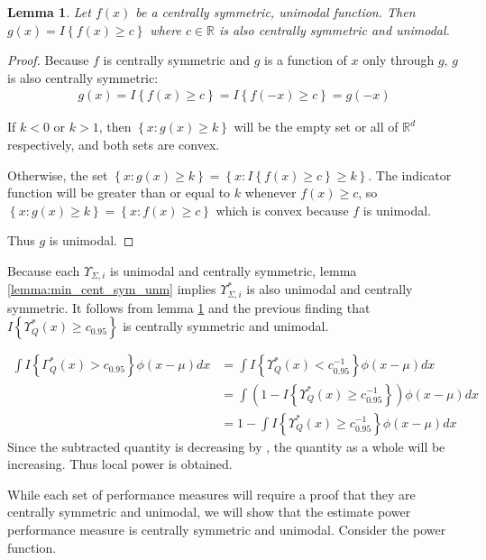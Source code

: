 \documentclass{article}
\newtheorem{lemma}[theorem]{Lemma}
\newcommand{\gi}{\Upsilon}
\begin{document}
\begin{lemma}
	\label{lemma:indct_cent_sym_unm}
	Let $f(x)$ be a centrally symmetric, unimodal function.  Then $g(x) = I\left\{f(x) \geq c\right\}$ where $c \in \mathbb{R}$ is also centrally symmetric and unimodal. 
\end{lemma}
\begin{proof}
Because $f$ is centrally symmetric and $g$ is a function of $x$ only through $g$, $g$ is also centrally symmetric:
	\begin{align*}
	g(x) = I\left\{f(x) \geq c\right\} = I\left\{f(-x) \geq c\right\} = g(-x)
	\end{align*}

	If $k < 0$ or $k > 1$, then $\left\{x : g(x) \geq k\right\}$ will be the empty set or all of $\mathbb{R}^d$ respectively, and both sets are convex.  
	
	Otherwise, the set $\left\{x : g(x) \geq k\right\} = \left\{x : I\left\{f(x) \geq c\right\} \geq k\right\}$. The indicator function will be greater than or equal to $k$ whenever $f(x) \geq c$, so $\left\{x : g(x) \geq k\right\} =\left\{x : f(x) \geq c\right\}$
	which is convex because $f$ is unimodal.

	Thus $g$ is unimodal.
\end{proof}

Because each $\gi_{\Sigma, i}$ is unimodal and centrally symmetric, lemma \ref{lemma:min_cent_sym_unm} implies $\gi^*_{\Sigma, i}$ is also unimodal and centrally symmetric. It follows from lemma \ref{lemma:indct_cent_sym_unm} and the previous finding that $I\left\{\gi^*_Q(x) \geq c_{0.95}\right\}$ is centrally symmetric and unimodal.  

\begin{align*}
	\int I\left\{\Gamma^*_Q(x) > c_{0.95}\right\} \phi(x - \mu) dx &= \int I\left\{\gi^*_Q(x) < c_{0.95}^{-1}\right\} \phi(x - \mu) dx\\
	& = \int \left(1 - I\left\{\gi^*_Q(x) \geq c^{-1}_{0.95}\right\}\right)\phi(x - \mu) dx
	\\
	&= 1 - \int I\left\{\gi^*_Q(x) \geq c^{-1}_{0.95}\right\} \phi(x - \mu) dx
\end{align*}
Since the subtracted quantity is decreasing by \citep{anderson_integral_1955}, the quantity as a whole will be increasing.  Thus local power is obtained.

While each set of performance measures will require a proof that they are centrally symmetric and unimodal, we will show that the estimate power performance measure is centrally symmetric and unimodal. Consider the power function.
\end{document}
